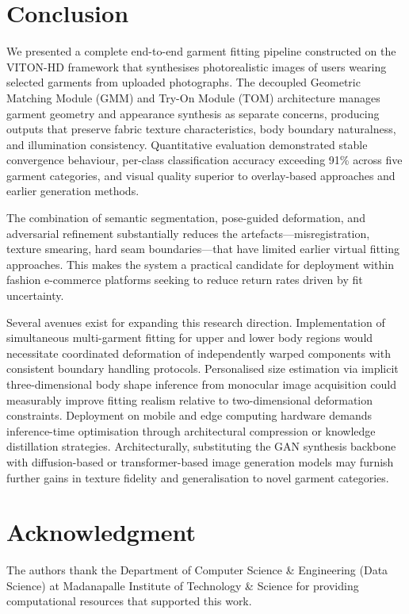 \documentclass[conference]{IEEEtran}
\begin{document}
\section{Conclusion}

We presented a complete end-to-end garment fitting pipeline constructed on the VITON-HD framework that synthesises photorealistic images of users wearing selected garments from uploaded photographs. The decoupled Geometric Matching Module (GMM) and Try-On Module (TOM) architecture manages garment geometry and appearance synthesis as separate concerns, producing outputs that preserve fabric texture characteristics, body boundary naturalness, and illumination consistency. Quantitative evaluation demonstrated stable convergence behaviour, per-class classification accuracy exceeding 91\% across five garment categories, and visual quality superior to overlay-based approaches and earlier generation methods.

The combination of semantic segmentation, pose-guided deformation, and adversarial refinement substantially reduces the artefacts—misregistration, texture smearing, hard seam boundaries—that have limited earlier virtual fitting approaches. This makes the system a practical candidate for deployment within fashion e-commerce platforms seeking to reduce return rates driven by fit uncertainty.

Several avenues exist for expanding this research direction. Implementation of simultaneous multi-garment fitting for upper and lower body regions would necessitate coordinated deformation of independently warped components with consistent boundary handling protocols. Personalised size estimation via implicit three-dimensional body shape inference from monocular image acquisition could measurably improve fitting realism relative to two-dimensional deformation constraints. Deployment on mobile and edge computing hardware demands inference-time optimisation through architectural compression or knowledge distillation strategies. Architecturally, substituting the GAN synthesis backbone with diffusion-based or transformer-based image generation models may furnish further gains in texture fidelity and generalisation to novel garment categories.

\section*{Acknowledgment}

The authors thank the Department of Computer Science \& Engineering (Data Science) at Madanapalle Institute of Technology \& Science for providing computational resources that supported this work.
\end{document}
